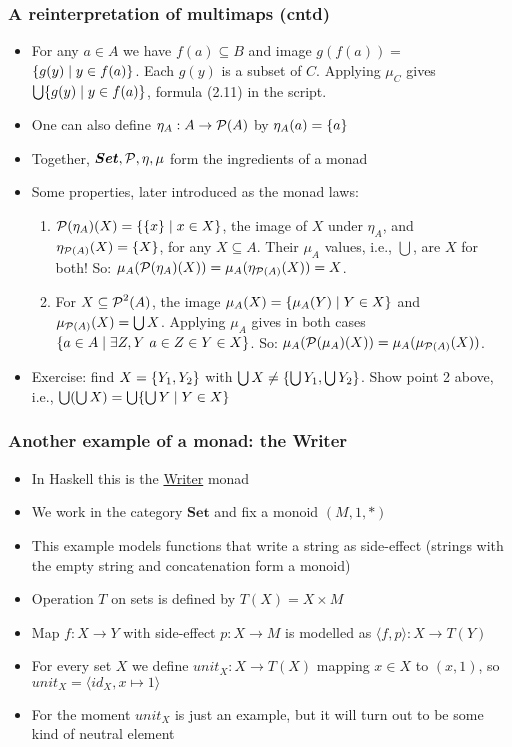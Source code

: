 \documentclass[handout]{beamer}
\newcommand{\bfsf}[1]{{\boldsymbol{#1}}}
\newcommand{\Set}{\bfsf{Set}}
\newcommand{\Kp}[1]{{\langle #1 \rangle}}
\begin{document}
\frame
  {   
    \frametitle{A reinterpretation of multimaps (cntd)}\label{Mon5:MultiMapReint}

 \begin{itemize}[<+->]
\item For any $a\in A$ we have $f(a)\subseteq B$ and {\color{red}image}
$g(f(a)) =$ $ \{g(y) \mid y\in f(a)\}$. Each $g(y)$ is a subset of $C$.
Applying $\mu_C$ gives $\bigcup \{g(y) \mid y\in f(a)\}$, formula (2.11)
in the script.
\item One can also define $\eta_A: A \to \operatorname{\mathcal{P}}(A)$ by $\eta_A(a)=\{a\}$
\item Together, $\Set, \powset, \eta, \mu$ form the ingredients of a monad
\item Some properties, later introduced as the monad laws: 
 \begin{enumerate}
\item $\operatorname{\mathcal{P}}(\eta_A)(X) = \{\{x\}\mid x\in X\}$,
the {\color{red}image} of $X$ under $\eta_A$, and $\eta_{\operatorname{\mathcal{P}}(A)}(X) = \{X\}$,
for any $X\subseteq A$. Their $\mu_A$ values, i.e., $\bigcup$, are $X$ for both!
So: $\mu_A(\operatorname{\mathcal{P}}(\eta_A)(X)) = \mu_A(\eta_{\operatorname{\mathcal{P}}(A)}(X)) = X$.
\item For $X\subseteq \operatorname{\mathcal{P}}^2(A)$, the {\color{red}image} 
$\mu_A(X) = \{\mu_A(Y)\mid Y\in X\}$
and $\mu_{\operatorname{\mathcal{P}}(A)}(X)=\bigcup X$. Applying $\mu_A$ gives in both cases
$\set{a\in A \mid \linebreak \exists Z,Y~a\in Z\in Y \in X}$. 
So: 
$\mu_A(\operatorname{\mathcal{P}}(\mu_A)(X)) = \mu_A(\mu_{\operatorname{\mathcal{P}}(A)}(X))$.
 \end{enumerate}
\item Exercise: find $X=\{Y_1,Y_2\}$ with 
$\bigcup X \neq \{\bigcup Y_1, \bigcup Y_2\}$.
Show point 2 above, i.e., $\bigcup(\bigcup X) = \bigcup \{\bigcup Y \mid Y\in X\}$
 \end{itemize}

 }

\frame
  {   
    \frametitle{Another example of a monad: the Writer}\label{Mon5:ExaSetMone}

 \begin{itemize}[<+->]
\item In Haskell this is the 
\href{https://wiki.haskell.org/All_About_Monads\#The_Writer\_monad}%
{\color{blue}Writer} monad
\item We work in the category $\Set$ and fix a monoid $(M,1,*)$
\item This example models functions that write a string as side-effect
(strings with the empty string and concatenation form a monoid)
\item Operation $T$ on sets is defined by $T(X)= X\times M$
\item Map $f : X\to Y$ with side-effect $p : X\to M$ is modelled as $\Kp{f,p} : X\to T(Y)$
\item For every set $X$ we define $unit_X: X\to T(X)$ mapping $x\in X$ to $(x,1)$,
so $unit_X = \Kp{id_X,x\mapsto 1}$
\item For the moment $unit_X$ is just an example, but it will turn out to
be some kind of neutral element
 \end{itemize}
 }
\end{document}
